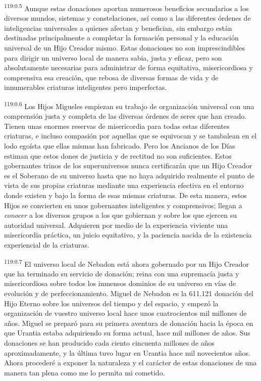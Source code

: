 \par
\textsuperscript{119:0.5} Aunque estas donaciones aportan numerosos beneficios secundarios a los diversos mundos, sistemas y constelaciones, así como a las diferentes órdenes de inteligencias universales a quienes afectan y benefician, sin embargo están destinadas principalmente a completar la formación personal y la educación universal de un Hijo Creador mismo. Estas donaciones no son imprescindibles para dirigir un universo local de manera sabia, justa y eficaz, pero son absolutamente necesarias para administrar de forma equitativa, misericordiosa y comprensiva esa creación, que rebosa de diversas formas de vida y de innumerables criaturas inteligentes pero imperfectas.

\par
\textsuperscript{119:0.6} Los Hijos Migueles empiezan su trabajo de organización universal con una comprensión justa y completa de las diversas órdenes de seres que han creado. Tienen unas enormes reservas de misericordia para todas estas diferentes criaturas, e incluso compasión por aquellas que se equivocan y se tambalean en el lodo egoísta que ellas mismas han fabricado. Pero los Ancianos de los Días estiman que estos dones de justicia y de rectitud no son suficientes. Estos gobernantes trinos de los superuniversos nunca certificarán que un Hijo Creador es el Soberano de su universo hasta que no haya adquirido realmente el punto de vista de sus propias criaturas mediante una experiencia efectiva en el entorno donde existen y bajo la forma de esas mismas criaturas. De esta manera, estos Hijos se convierten en unos gobernantes inteligentes y comprensivos; llegan a \textit{conocer} a los diversos grupos a los que gobiernan y sobre los que ejercen su autoridad universal. Adquieren por medio de la experiencia viviente una misericordia práctica, un juicio equitativo, y la paciencia nacida de la existencia experiencial de la criaturas.

\par
\textsuperscript{119:0.7} El universo local de Nebadon está ahora gobernado por un Hijo Creador que ha terminado su servicio de donación; reina con una supremacía justa y misericordiosa sobre todos los inmensos dominios de su universo en vías de evolución y de perfeccionamiento. Miguel de Nebadon es la 611.121{\textordfeminine} donación del Hijo Eterno sobre los universos del tiempo y del espacio, y empezó la organización de vuestro universo local hace unos cuatrocientos mil millones de años. Miguel se preparó para su primera aventura de donación hacia la época en que Urantia estaba adquiriendo su forma actual, hace mil millones de años. Sus donaciones se han producido cada ciento cincuenta millones de años aproximadamente, y la última tuvo lugar en Urantia hace mil novecientos años. Ahora procederé a exponer la naturaleza y el carácter de estas donaciones de una manera tan plena como me lo permita mi cometido.

